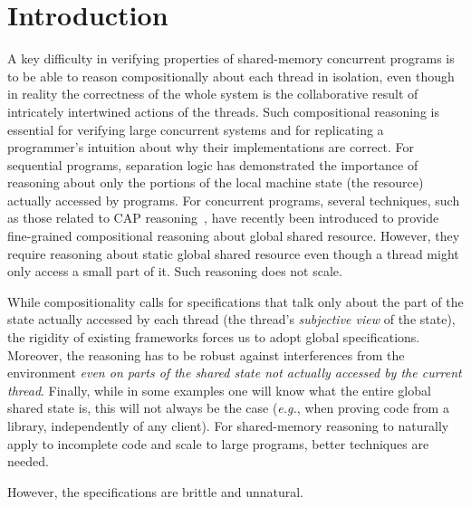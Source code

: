 \section{Introduction}





A key difficulty in verifying properties of shared-memory concurrent
programs is to be able to reason compositionally about each thread in
isolation, even though in reality the correctness of the whole system
is the collaborative result of intricately intertwined actions of the
threads.  Such compositional reasoning is essential for verifying
large concurrent systems and for replicating a programmer's intuition
about why their implementations are correct. For sequential programs,
separation logic has demonstrated the importance of reasoning about
only the portions of the local machine state (the resource) actually
accessed by programs. For concurrent programs, several
techniques, such as those related to CAP reasoning~\cite{lotsofthem},  have recently been introduced to provide
fine-grained compositional reasoning about global shared resource.
However, they require
reasoning about static  global shared resource even though a thread might
only access a small part of it. Such  reasoning does  not scale.

While
compositionality calls for specifications that talk only about the
part of the state actually accessed by each thread (the thread's
\emph{subjective view} of the state), the rigidity of existing
frameworks forces us to adopt global specifications. Moreover, the
reasoning has to be robust against interferences from the environment
\emph{even on parts of the shared state not actually accessed by the
  current thread}. Finally, while in some examples one will know what
the entire global shared state is, this will not always be the case
(\textit{e.g.}, when proving code from a library, independently of any
client). For shared-memory reasoning to naturally apply to incomplete
code and scale to large programs, better techniques are needed.


However, the specifications are brittle and unnatural.

